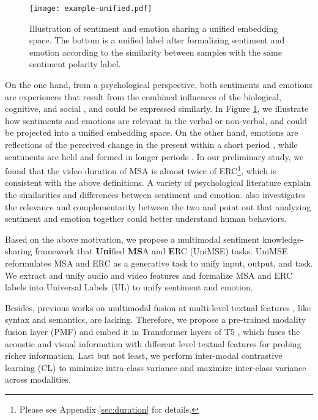 \documentclass[11pt]{article}
\begin{document}
\begin{figure}[t]
\centering
\texttt{[image: example-unified.pdf]}
\caption{Illustration of sentiment and emotion sharing a unified embedding space. The bottom is a unified label after formalizing sentiment and emotion according to the similarity  between samples with the same sentiment polarity label.}
\label{fig:example}
\end{figure}

On the one hand, from a psychological perspective, both sentiments and emotions are experiences that result from the combined influences of the biological, cognitive, and social \cite{stets2006emotions}, and could be expressed similarly. In Figure \ref{fig:example}, we illustrate how sentiments and emotions are relevant in the verbal or non-verbal, and could be projected into a unified embedding space. On the other hand, emotions are reflections of the perceived change in the present within a short period \cite{batson1992differentiating}, while sentiments are held and formed in longer periods \cite{murray1945clinical}. In our preliminary study, we found that the video duration of MSA is almost twice of ERC\footnote{Please see Appendix \ref{sec:duration} for details.}, which is consistent with the above definitions. A variety of psychological literature \cite{davidson2009handbook,ben2001subtlety,shelly2004emotions} explain the similarities and differences between sentiment and emotion. \citet{DBLP:journals/taffco/MunezeroMSP14} also investigates the relevance and complementarity between the two and point out that analyzing sentiment and emotion together could better understand human behaviors.

Based on the above motivation, we propose a multimodal sentiment knowledge-sharing framework that \textbf{Uni}fied \textbf{MS}A and \textbf{E}RC (UniMSE) tasks. UniMSE reformulates MSA and ERC as a generative task to unify input, output, and task. We extract and unify audio and video features and formalize MSA and ERC labels into Universal Labels (UL) to unify sentiment and emotion.

Besides, previous works on multimodal fusion at multi-level textual features \cite{DBLP:conf/naacl/PetersNIGCLZ18,DBLP:conf/nips/VaswaniSPUJGKP17}, like syntax and semantics, are lacking. Therefore, we propose a pre-trained modality fusion layer (PMF) and embed it in Transformer \cite{DBLP:conf/nips/VaswaniSPUJGKP17} layers of T5 \cite{DBLP:journals/jmlr/RaffelSRLNMZLL20}, which fuses the acoustic and visual information with different level textual features for probing richer information. Last but not least, we perform inter-modal contrastive learning (CL) to minimize intra-class variance and maximize inter-class variance across modalities.
\end{document}
